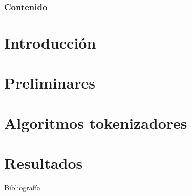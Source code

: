 \documentclass{beamer}
\begin{document}
  {
  \frame{\titlepage}}

  \begin{frame}
    \frametitle{Contenido}
    \setcounter{tocdepth}{1}
    \tableofcontents[pausesections]
  \end{frame}

  \setlength{\parskip}{0.5em}

  \section{Introducción}

  \section{Preliminares}

  \section{Algoritmos tokenizadores}

  \section{Resultados}

  \begin{frame}[allowframebreaks]{Bibliografía}
    \printbibliography
  \end{frame}

  \setlength{\parskip}{0.0em}

  {
  \frame{\titlepage}}
\end{document}
